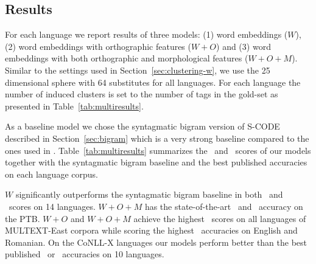 \subsection{Results}
\label{sec:multires}

For each language we report results of three models: (1) word
embeddings ($W$), (2) word embeddings with orthographic features
($W+O$) and (3) word embeddings with both orthographic and
morphological features ($W+O+M$).  Similar to the settings used in
Section~\ref{sec:clustering-w}, we use the 25 dimensional sphere with 64
substitutes for all languages.  For each language the number of
induced clusters is set to the number of tags in the gold-set as
presented in Table~\ref{tab:multiresults}.

As a baseline model we chose the syntagmatic bigram version of S-CODE
described in Section~\ref{sec:bigram} which is a very strong baseline
compared to the ones used in
\cite{christodoulopoulos-goldwater-steedman:2011:EMNLP}.
Table~\ref{tab:multiresults} summarizes the \mto\ and \vm\ scores of
our models together with the syntagmatic bigram baseline and the best
published accuracies on each language corpus.

$W$ significantly outperforms the syntagmatic bigram baseline in both
\mto\ and \vm\ scores on 14 languages.  $W+O+M$ has the
state-of-the-art \mto\ and \vm\ accuracy on the PTB.  $W+O$ and
$W+O+M$ achieve the highest \mto\ scores on all languages of
MULTEXT-East corpora while scoring the highest \vm\ accuracies on
English and Romanian.  On the CoNLL-X languages our models perform
better than the best published \mto\ or \vm\ accuracies on 10
languages.

